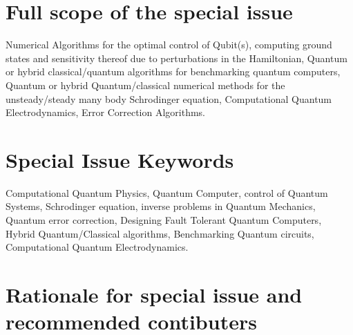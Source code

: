 \documentclass[]{article}
\begin{document}
 
\section{Full scope of the special issue }

Numerical Algorithms for the optimal control of Qubit(s), computing ground states and sensitivity thereof due to perturbations in the Hamiltonian, Quantum or hybrid classical/quantum algorithms for benchmarking quantum computers, Quantum or hybrid Quantum/classical numerical methods for the unsteady/steady many body Schrodinger equation, Computational Quantum Electrodynamics, Error Correction Algorithms.

\section{Special Issue Keywords }

Computational Quantum Physics, Quantum Computer, control of Quantum Systems, Schrodinger equation, inverse problems in Quantum Mechanics, Quantum error correction, Designing Fault Tolerant Quantum Computers, Hybrid Quantum/Classical algorithms, Benchmarking Quantum circuits, Computational Quantum Electrodynamics.

\section{Rationale for special issue and recommended contibuters}

\end{document}
